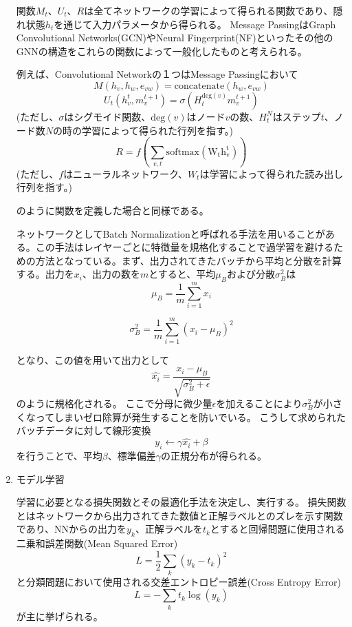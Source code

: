 \begin{enumerate}
関数$M_t$、$U_t$、$R$は全てネットワークの学習によって得られる関数であり、隠れ状態$h_t$を通じて入力パラメータから得られる。
Message PassingはGraph Convolutional Networks(GCN)やNeural Fingerprint(NF)といったその他のGNNの構造をこれらの関数によって一般化したものと考えられる。

例えば、Convolutional Networkの１つはMessage Passingにおいて
\begin{equation}
M(h_v,h_w,e_{vw}) = \mathrm{concatenate}(h_w,e_{vw})
\end{equation}
\begin{equation}
U_t(h_v^t,m_v^{t+1}) = \sigma(H_t^{\mathrm{deg}(v)}m_v^{t+1})
\end{equation}
(ただし、$\sigma$はシグモイド関数、$\mathrm{deg}(v)$はノード$v$の数、$H_t^N$はステップ$t$、ノード数$N$の時の学習によって得られた行列を指す。)
\begin{equation}
R = f(\sum_{v,t} \mathrm{softmax(W_th_v^t)})
\end{equation}
(ただし、$f$はニューラルネットワーク、$W_t$は学習によって得られた読み出し行列を指す。)

のように関数を定義した場合と同様である。

ネットワークとしてBatch Normalizationと呼ばれる手法を用いることがある。この手法はレイヤーごとに特徴量を規格化することで過学習を避けるための方法となっている。まず、出力されてきたバッチから平均と分散を計算する。出力を$x_i$、出力の数を$m$とすると、平均$\mu_B$および分散$\sigma_B^2$は
\[
\mu_B = \frac{1}{m}\sum_{i=1}^m x_i
\]

\[
\sigma_B^2 = \frac{1}{m}\sum_{i=1}^m(x_i-\mu_B)^2
\]

となり、この値を用いて出力として
\begin{equation}
\hat{x_i} = \frac{x_i - \mu_B}{\sqrt{\sigma_B^2+\epsilon}}
\end{equation}
のように規格化される。
ここで分母に微少量$\epsilon$を加えることにより$\sigma_B^2$が小さくなってしまいゼロ除算が発生することを防いでいる。
こうして求められたバッチデータに対して線形変換
\begin{equation}
y_i\leftarrow\gamma\hat{x_i}+\beta
\end{equation}
を行うことで、平均$\beta$、標準偏差$\gamma$の正規分布が得られる。

\item モデル学習

学習に必要となる損失関数とその最適化手法を決定し、実行する。
損失関数とはネットワークから出力されてきた数値と正解ラベルとのズレを示す関数であり、NNからの出力を$y_k$、正解ラベルを$t_k$とすると回帰問題に使用される二乗和誤差関数(Mean Squared Error)
\[
L=\frac{1}{2}\sum_k (y_k-t_k)^2
\]
と分類問題において使用される交差エントロピー誤差(Cross Entropy Error)
\[
L=-\sum_k t_k\log(y_k)
\]
が主に挙げられる。


\end{enumerate}

